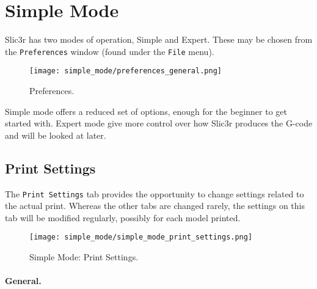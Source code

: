 \section{Simple Mode} %
\label{sec:simple_mode}

Slic3r has two modes of operation, Simple and Expert. These may be chosen from the \texttt{Preferences} window (found under the \texttt{File} menu).

\begin{figure}[ht]
\centering
\texttt{[image: simple\_mode/preferences\_general.png]}
\caption{Preferences.}
\label{fig:preferences_general}
\end{figure}

Simple mode offers a reduced set of options, enough for the beginner to get started with.  Expert mode give more control over how Slic3r produces the G-code and will be looked at later.

\subsection{Print Settings}

The \texttt{Print Settings} tab provides the opportunity to change settings related to the actual print.  Whereas the other tabs are changed rarely, the settings on this tab will be modified regularly, possibly for each model printed.

\begin{figure}[ht]
\centering
\texttt{[image: simple\_mode/simple\_mode\_print\_settings.png]}
\caption{Simple Mode: Print Settings.}
\label{fig:simple_mode_print_settings}
\end{figure}

\paragraph{General.} %
\label{par:simple_general}


